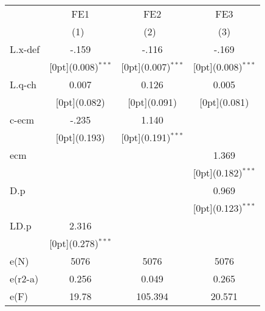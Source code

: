\begin{tabular*}{\textwidth}{@{\extracolsep{\fill}}lccc}			
	& \multicolumn{1}{c}{FE1} &	\multicolumn{1}{c}{FE2} &	\multicolumn{1}{c}{FE3} \\
\cline{2-4}			
	& \multicolumn{1}{c}{(1)\mbox{\ }} &	\multicolumn{1}{c}{(2)\mbox{\ }} &	\multicolumn{1}{c}{(3)} \\
\hline			
L.x-def &	-.159 &	-.116 &	-.169 \\
&	\raisebox{.7ex}[0pt]{\scriptsize (0.008)$^{***}$} &	\raisebox{.7ex}[0pt]{\scriptsize (0.007)$^{***}$} &	\raisebox{.7ex}[0pt]{\scriptsize (0.008)$^{***}$} \\
L.q-ch &	0.007 &	0.126 &	0.005 \\
&	\raisebox{.7ex}[0pt]{\scriptsize (0.082)} &	\raisebox{.7ex}[0pt]{\scriptsize (0.091)} &	\raisebox{.7ex}[0pt]{\scriptsize (0.081)} \\
c-ecm &	-.235 &	1.140 &	\\
&	\raisebox{.7ex}[0pt]{\scriptsize (0.193)} &	\raisebox{.7ex}[0pt]{\scriptsize (0.191)$^{***}$} &	\\
ecm &	&	&	1.369 \\
&	&	&	\raisebox{.7ex}[0pt]{\scriptsize (0.182)$^{***}$} \\
D.p &	&	&	0.969 \\
&	&	&	\raisebox{.7ex}[0pt]{\scriptsize (0.123)$^{***}$} \\
LD.p &	2.316 &	&	\\
&	\raisebox{.7ex}[0pt]{\scriptsize (0.278)$^{***}$} &	&	\\
e(N) &	5076 &	5076 &	5076 \\
e(r2-a) &	0.256 &	0.049 &	0.265 \\
e(F) &	19.78 &	105.394 &	20.571 \\
\hline\hline			
\end{tabular*}%

